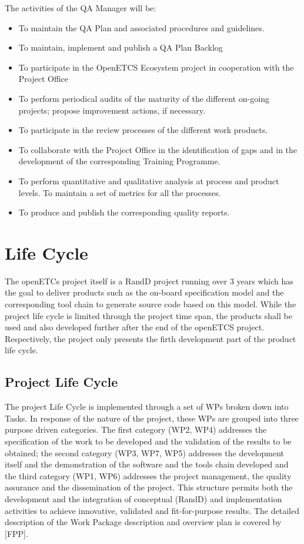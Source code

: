 \documentclass{template/openetcs_article}
\begin{document}
The activities of the QA Manager will be:
\begin{itemize}
\item To maintain the QA Plan and associated procedures and guidelines. 
\item To maintain, implement and publish a QA Plan Backlog
\item To participate in the OpenETCS Ecosystem project in cooperation with the Project Office
\item To perform periodical audits of the maturity of the different on-going projects; propose improvement actions, if necessary.
\item To participate in the review processes of the different work products.
\item To collaborate with the Project Office in the identification of gaps and in the development of the corresponding Training Programme.
\item To perform quantitative and qualitative analysis at process and product levels. To maintain a set of metrics for all the processes.
\item To produce and publish the corresponding quality reports.
\end{itemize}


\newpage
\section{Life Cycle}

The openETCs project itself is a \gls{RandD} project running over 3 years which has the goal to deliver products such as the on-board specification model and the corresponding tool chain to generate source code based on this model. While the project life cycle is limited through the project time span, the products shall be used and also developed further after the end of the openETCS project. Respectively, the project only presents the firth development part of the product life cycle.

\subsection{Project Life Cycle }

The project Life Cycle is implemented through a set of WPs broken down into Tasks. In response of the nature of the project, these WPs are grouped into three purpose driven categories. The first category (WP2, WP4) addresses the specification of the work to be developed and the validation of the results to be obtained; the second category (WP3, WP7, WP5) addresses the development itself and the demonstration of the software and the tools chain developed and the third category (WP1, WP6) addresses the project management, the quality assurance and the dissemination of the project.
This structure permits both the development and the integration of conceptual (\gls{RandD}) and implementation activities to achieve innovative, validated and fit-for-purpose results.
The detailed description of the Work Package description and overview plan is covered by [FPP].  
\end{document}

